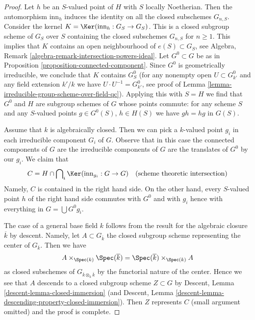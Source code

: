 \begin{proof}
\medskip\noindent
Let $h$ be an $S$-valued point of $H$ with $S$ locally Noetherian.
Then the automorphism $\text{inn}_h$ induces the identity on all
the closed subschemes $G_{n, S}$. Consider the kernel
$K = \Ker(\text{inn}_h : G_S \to G_S)$.
This is a closed subgroup scheme of $G_S$ over $S$ containing the
closed subschemes $G_{n, S}$ for $n \geq 1$.
This implies that $K$ contains an open neighbourhood of
$e(S) \subset G_S$, see
Algebra, Remark \ref{algebra-remark-intersection-powers-ideal}.
Let $G^0 \subset G$ be as in Proposition \ref{proposition-connected-component}.
Since $G^0$ is geometrically irreducible, we conclude that $K$ contains
$G^0_S$ (for any nonempty open $U \subset G^0_{k'}$ and any field extension
$k'/k$ we have $U \cdot U^{-1} = G^0_{k'}$, see proof of
Lemma \ref{lemma-irreducible-group-scheme-over-field-qc}).
Applying this with $S = H$ we find that $G^0$ and $H$
are subgroup schemes of $G$ whose points commute: for any scheme $S$
and any $S$-valued points $g \in G^0(S)$, $h \in H(S)$ we have
$gh = hg$ in $G(S)$.

\medskip\noindent
Assume that $k$ is algebraically closed. Then we can pick a $k$-valued
point $g_i$ in each irreducible component $G_i$ of $G$. Observe that in
this case the connected components of $G$ are the irreducible components
of $G$ are the translates of $G^0$ by our $g_i$. We claim that
$$
C = H \cap \bigcap\nolimits_i \Ker(\text{inn}_{g_i} : G \to G)
\quad (\text{scheme theoretic intersection})
$$
Namely, $C$ is contained in the right hand side. On the other hand, every
$S$-valued point $h$ of the right hand side commutes with $G^0$
and with $g_i$ hence with everything in $G = \bigcup G^0g_i$.

\medskip\noindent
The case of a general base field $k$ follows from the result for the
algebraic closure $\overline{k}$ by descent. Namely, let
$A \subset G_{\overline{k}}$ the closed subgroup scheme representing
the center of $G_{\overline{k}}$. Then we have
$$
A \times_{\Spec(k)} \Spec(\overline{k}) =
\Spec(\overline{k}) \times_{\Spec(k)} A
$$
as closed subschemes of $G_{\overline{k} \otimes_k \overline{k}}$ by
the functorial nature of the center. Hence we see that $A$ descends
to a closed subgroup scheme $Z \subset G$ by
Descent, Lemma \ref{descent-lemma-closed-immersion}
(and Descent, Lemma \ref{descent-lemma-descending-property-closed-immersion}).
Then $Z$ represents $C$ (small argument omitted) and the proof is complete.
\end{proof}







